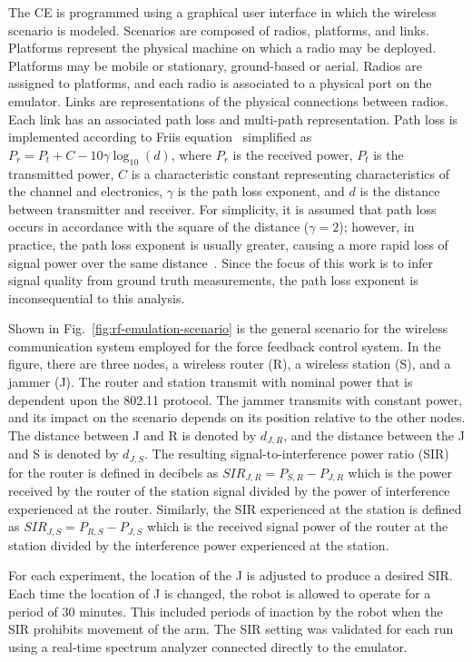 The CE is programmed using a graphical user interface in which the wireless scenario is modeled.  Scenarios are composed of radios, platforms, and links.  Platforms represent the physical machine on which a radio may be deployed.  Platforms may be mobile or stationary, ground-based or aerial. Radios are assigned to platforms, and each radio is associated to a physical port on the emulator.  Links are representations of the physical connections between radios.  Each link has an associated path loss and multi-path representation.  Path loss is implemented according to Friis equation~\cite{Shaw2013.Frii} simplified as 
$P_r = P_t + C - 10\gamma\log_{10}\left( d \right)$, 
where $P_r$ is the received power, $P_t$ is the transmitted power, $C$ is a characteristic constant representing characteristics of the channel and electronics, $\gamma$ is the path loss exponent, and $d$ is the distance between transmitter and receiver.  For simplicity, it is assumed that path loss occurs in accordance with the square of the distance ($\gamma=2$); however, in practice, the path loss exponent is usually greater, causing a more rapid loss of signal power over the same distance~\cite{Candell2017.NIST1951}.  Since the focus of this work is to infer signal quality from ground truth measurements, the path loss exponent is inconsequential to this analysis.


Shown in Fig.~\ref{fig:rf-emulation-scenario} is the general scenario for the wireless communication system employed for the force feedback control system.  In the figure, there are three nodes, a wireless router (R), a wireless station (S), and a jammer (J).  The router and station transmit with nominal power that is dependent upon the 802.11 protocol. The jammer transmits with constant power, and its impact on the scenario depends on its position relative to the other nodes.  The distance between J and R is denoted by $d_{J,R}$, and the distance between the J and S is denoted by $d_{J,S}$.  The resulting signal-to-interference power ratio (SIR) for the router is defined in decibels as $SIR_{J,R} = P_{S,R}-P_{J,R}$ which is the power received by the router of the station signal divided by the power of interference experienced at the router.  Similarly, the SIR experienced at the station is defined as $SIR_{J,S} = P_{R,S}-P_{J,S}$ which is the received signal power of the router at the station divided by the interference power experienced at the station.

For each experiment, the location of the J is adjusted to produce a desired SIR.  Each time the location of J is changed, the robot is allowed to operate for a period of 30 minutes.  This included periods of inaction by the robot when the SIR prohibits movement of the arm.  The SIR setting was validated for each run using a real-time spectrum analyzer connected directly to the emulator.

	
	
	
	
	


